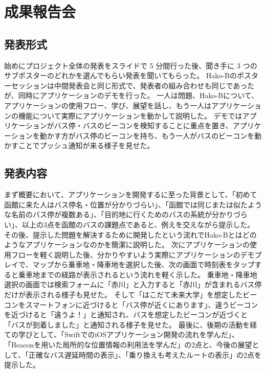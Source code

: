 \documentclass[openany,11pt,papersize]{jsbook}
\begin{document}

\section{成果報告会}
\subsection{発表形式}
始めにプロジェクト全体の発表をスライドで 5 分間行った後、聞き手に 3 つのサブポスターのどれかを選んでもらい発表を聞いてもらった。
Hako-Bのポスターセッションは中間発表会と同じ形式で、発表者の組み合わせも同じであったが、同時にアプリケーションのデモを行った。
一人は問題、Hako-Bについて、アプリケーションの使用フロー、学び、展望を話し、もう一人はアプリケーションの機能について実際にアプリケーションを動かして説明した。
デモではアプリケーションがバス停・バスのビーコンを検知することに重点を置き、アプリケーションを動かす方がバス停のビーコンを持ち、もう一人がバスのビーコンを動かすことでプッシュ通知が来る様子を見せた。


\subsection{発表内容}
まず概要において、アプリケーションを開発するに至った背景として、「初めて函館に来た人はバス停名・位置が分かりづらい」、「函館では同じまたは似たような名前のバス停が複数ある」、「目的地に行くためのバスの系統が分かりづらい」、以上の3点を函館のバスの課題点であると、例えを交えながら提示した。
その後、提示した問題を解決するために開発したという流れでHako-Bとはどのようなアプリケーションなのかを簡潔に説明した。
次にアプリケーションの使用フローを軽く説明した後、分かりやすいよう実際にアプリケーションのデモプレイで、マップから乗車地・降車地を選択した後、次の画面で時刻表をタップすると乗車地までの経路が表示されるという流れを軽く示した。
乗車地・降車地選択の画面では検索フォームに「赤川」と入力すると「赤川」が含まれるバス停だけが表示される様子も見せた。
そして「はこだて未来大学」を想定したビーコンをスマートフォンに近づけると「バス停が近くにあります」、違うビーコンを近づけると「違うよ！」と通知され、バスを想定したビーコンが近づくと「バスが到着しました」と通知される様子を見せた。
最後に、後期の活動を経ての学びとして、「SwiftでのiOSアプリケーション開発の流れを学んだ」、「Beaconを用いた局所的な位置情報の利用法を学んだ」の2点と、今後の展望として、「正確なバス遅延時間の表示」、「乗り換えも考えたルートの表示」の2点を提示した。

\end{document}
